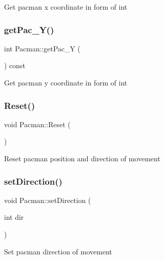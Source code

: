 Get pacman x coordinate in form of int \mbox{\label{class_pacman_a1195bf43607ca5e957446fccad19c41d}} 
\subsubsection{\texorpdfstring{get\+Pac\+\_\+\+Y()}{getPac\_Y()}}
{\footnotesize\ttfamily int Pacman\+::get\+Pac\+\_\+Y (\begin{DoxyParamCaption}{ }\end{DoxyParamCaption}) const\hspace{0.3cm}{\ttfamily [inline]}}

Get pacman y coordinate in form of int \mbox{\label{class_pacman_ad1666842876ddd5f4ff615606a5260d7}} 
\subsubsection{\texorpdfstring{Reset()}{Reset()}}
{\footnotesize\ttfamily void Pacman\+::\+Reset (\begin{DoxyParamCaption}{ }\end{DoxyParamCaption})}

Reset pacman position and direction of movement \mbox{\label{class_pacman_a388f4708c08ba930b471237a897f522e}} 
\subsubsection{\texorpdfstring{set\+Direction()}{setDirection()}}
{\footnotesize\ttfamily void Pacman\+::set\+Direction (\begin{DoxyParamCaption}\item[{int}]{dir }\end{DoxyParamCaption})\hspace{0.3cm}{\ttfamily [inline]}}

Set pacman direction of movement \mbox{\label{class_pacman_a0c03f6603520227d0e79ae1266eeaa85}} 

